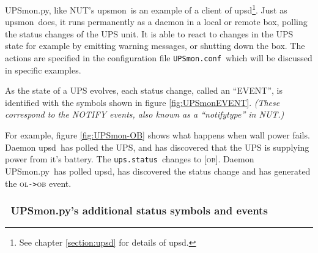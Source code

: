 \documentclass[12pt]{article}
\newlength{\headersep}\setlength{\headersep}{3mm}
\newcommand{\Hsep}{\hspace{\headersep}}
\newcommand{\upsd}{\mbox{\textcolor{UPSDCOLOUR}{upsd}}}
\newcommand{\upsmon}{\mbox{\textcolor{MONCOLOUR}{upsmon}}}
\newcommand{\UPSmon}{\mbox{\textcolor{UPSMONCOLOUR}{UPSmon.py}}}
\newcommand{\OB}{\textcolor{UPSDCOLOUR}{\textsc{ob}}}
\newcommand{\OL}{\textcolor{UPSDCOLOUR}{\textsc{ol}}}
\newcommand{\status}[1]{\textcolor{UPSDCOLOUR}{[{#1}]}}
\newcommand{\EVENT}[2]{\textcolor{MONCOLOUR}{#1}{\allowbreak}\texttt{\textcolor{MONCOLOUR}{->}}{\allowbreak}\textcolor{MONCOLOUR}{#2}}
\newcommand{\UPSmonconf}{\textcolor{UPSMONCOLOUR}{\texttt{UPSmon.conf}}}
\newcommand{\upsstatus}{\textcolor{UPSDCOLOUR}{\texttt{ups{\allowbreak}.status}}}
\begin{document}
\UPSmon, like NUT's \upsmon\ is an example of a client of \upsd\footnote{See
  chapter \ref{section:upsd} for details of \upsd.}.  Just as \upsmon\ does,
it runs permanently as a daemon in a local or remote box, polling the status
changes of the UPS unit.  It is able to react to changes in the UPS state for
example by emitting warning messages, or shutting down the box.  The actions
are specified in the configuration file \UPSmonconf\ which will be discussed
in specific examples.

As the state of a UPS evolves, each status change, called an ``EVENT'', is
identified with the symbols shown in figure \ref{fig:UPSmonEVENT}.
\textit{(These correspond to the NOTIFY events, also known as a ``notifytype''
  in NUT.)}

For example, figure \ref{fig:UPSmon-OB} shows what happens when wall power
fails.  Daemon \upsd\ has polled the UPS, and has discovered that the UPS is
supplying power from it's battery.  The \upsstatus\ changes to \status{\OB}.
Daemon \UPSmon\ has polled \upsd, has discovered the status change and has
generated the \EVENT{\OL}{\OB} event.

\subsubsection{\Hsep\ \UPSmon's additional status symbols and events}\label{section:stcha}
\end{document}
